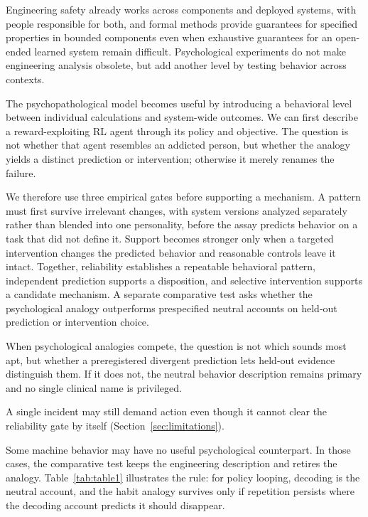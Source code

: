 \documentclass{article}
\begin{document}
Engineering safety already works across components and deployed systems, with people responsible for both, and formal methods provide guarantees for specified properties in bounded components even when exhaustive guarantees for an open-ended learned system remain difficult. Psychological experiments do not make engineering analysis obsolete, but add another level by testing behavior across contexts.

The psychopathological model becomes useful by introducing a behavioral level between individual calculations and system-wide outcomes. We can first describe a reward-exploiting RL agent through its policy and objective. The question is not whether that agent resembles an addicted person, but whether the analogy yields a distinct prediction or intervention; otherwise it merely renames the failure.

We therefore use three empirical gates before supporting a mechanism. A pattern must first survive irrelevant changes, with system versions analyzed separately rather than blended into one personality, before the assay predicts behavior on a task that did not define it. Support becomes stronger only when a targeted intervention changes the predicted behavior and reasonable controls leave it intact. Together, reliability establishes a repeatable behavioral pattern, independent prediction supports a disposition, and selective intervention supports a candidate mechanism. A separate comparative test asks whether the psychological analogy outperforms prespecified neutral accounts on held-out prediction or intervention choice.

When psychological analogies compete, the question is not which sounds most apt, but whether a preregistered divergent prediction lets held-out evidence distinguish them. If it does not, the neutral behavior description remains primary and no single clinical name is privileged.

A single incident may still demand action even though it cannot clear the reliability gate by itself (Section~\ref{sec:limitations}).

Some machine behavior may have no useful psychological counterpart. In those cases, the comparative test keeps the engineering description and retires the analogy. Table~\ref{tab:table1} illustrates the rule: for policy looping, decoding is the neutral account, and the habit analogy survives only if repetition persists where the decoding account predicts it should disappear.
\end{document}
